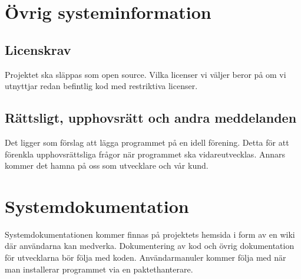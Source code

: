 \section{Övrig systeminformation} %

\subsection{Licenskrav}
Projektet ska släppas som open source. Vilka licenser vi väljer beror på om vi utnyttjar redan befintlig kod med restriktiva licenser.

\subsection{Rättsligt, upphovsrätt och andra meddelanden}
Det ligger som förslag att lägga programmet på en idell förening. Detta för att förenkla upphovsrättsliga frågor när programmet ska vidareutvecklas. Annars kommer det hamna på oss som utvecklare och vår kund. 


\section{Systemdokumentation}
Systemdokumentationen kommer finnas på projektets hemsida i form av en wiki där användarna kan medverka. Dokumentering av kod och övrig dokumentation för utvecklarna bör följa med koden. Användarmanuler kommer följa med när man installerar programmet via en paktethanterare. %


